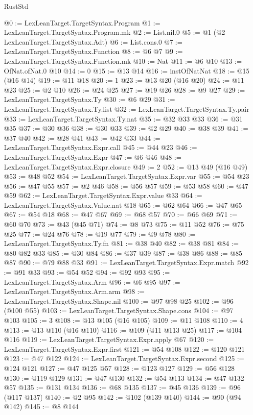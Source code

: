 \begin{lexlean}{RustStd}
\begin{coremodule}
@0 := LexLeanTarget.TargetSyntax.Program
@1 := LexLeanTarget.TargetSyntax.Program.mk
@2 := List.nil.{0}
@5 := @1 (@2 LexLeanTarget.TargetSyntax.Adt)
@6 := List.cons.{0}
@7 := LexLeanTarget.TargetSyntax.Function
@8 := @6 @7
@9 := LexLeanTarget.TargetSyntax.Function.mk
@10 := Nat
@11 := @6 @10
@13 := OfNat.ofNat.{0} @10
@14 := 0
@15 := @13 @14
@16 := instOfNatNat
@18 := @15 (@16 @14)
@19 := @11 @18
@20 := 1
@23 := @13 @20 (@16 @20)
@24 := @11 @23
@25 := @2 @10
@26 := @24 @25
@27 := @19 @26
@28 := @9 @27
@29 := LexLeanTarget.TargetSyntax.Ty
@30 := @6 @29
@31 := LexLeanTarget.TargetSyntax.Ty.list
@32 := LexLeanTarget.TargetSyntax.Ty.pair
@33 := LexLeanTarget.TargetSyntax.Ty.nat
@35 := @32 @33 @33
@36 := @31 @35
@37 := @30 @36
@38 := @30 @33
@39 := @2 @29
@40 := @38 @39
@41 := @37 @40
@42 := @28 @41
@43 := @42 @33
@44 := LexLeanTarget.TargetSyntax.Expr.call
@45 := @44 @23
@46 := LexLeanTarget.TargetSyntax.Expr
@47 := @6 @46
@48 := LexLeanTarget.TargetSyntax.Expr.closure
@49 := 2
@52 := @13 @49 (@16 @49)
@53 := @48 @52
@54 := LexLeanTarget.TargetSyntax.Expr.var
@55 := @54 @23
@56 := @47 @55
@57 := @2 @46
@58 := @56 @57
@59 := @53 @58
@60 := @47 @59
@62 := LexLeanTarget.TargetSyntax.Expr.value @33
@64 := LexLeanTarget.TargetSyntax.Value.nat @18
@65 := @62 @64
@66 := @47 @65
@67 := @54 @18
@68 := @47 @67
@69 := @68 @57
@70 := @66 @69
@71 := @60 @70
@73 := @43 (@45 @71)
@74 := @8 @73
@75 := @11 @52
@76 := @75 @25
@77 := @24 @76
@78 := @19 @77
@79 := @9 @78
@80 := LexLeanTarget.TargetSyntax.Ty.fn
@81 := @38 @40
@82 := @38 @81
@84 := @80 @82 @33
@85 := @30 @84
@86 := @37 @39
@87 := @38 @86
@88 := @85 @87
@90 := @79 @88 @33
@91 := LexLeanTarget.TargetSyntax.Expr.match
@92 := @91 @33
@93 := @54 @52
@94 := @92 @93
@95 := LexLeanTarget.TargetSyntax.Arm
@96 := @6 @95
@97 := LexLeanTarget.TargetSyntax.Arm.arm
@98 := LexLeanTarget.TargetSyntax.Shape.nil
@100 := @97 @98 @25
@102 := @96 (@100 @55)
@103 := LexLeanTarget.TargetSyntax.Shape.cons
@104 := @97 @103
@105 := 3
@108 := @13 @105 (@16 @105)
@109 := @11 @108
@110 := 4
@113 := @13 @110 (@16 @110)
@116 := @109 (@11 @113 @25)
@117 := @104 @116
@119 := LexLeanTarget.TargetSyntax.Expr.apply @67
@120 := LexLeanTarget.TargetSyntax.Expr.first
@121 := @54 @108
@122 := @120 @121
@123 := @47 @122
@124 := LexLeanTarget.TargetSyntax.Expr.second
@125 := @124 @121
@127 := @47 @125 @57
@128 := @123 @127
@129 := @56 @128
@130 := @119 @129
@131 := @47 @130
@132 := @54 @113
@134 := @47 @132 @57
@135 := @131 @134
@136 := @68 @135
@137 := @45 @136
@139 := @96 (@117 @137)
@140 := @2 @95
@142 := @102 (@139 @140)
@144 := @90 (@94 @142)
@145 := @8 @144

\end{coremodule}
\end{lexlean}
